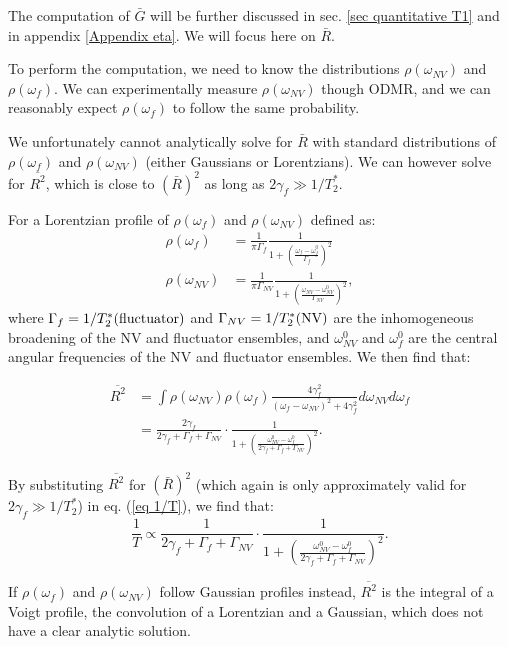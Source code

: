 \documentclass[a4paper, 11pt]{report}
\begin{document}
The computation of $\bar G$ will be further discussed in sec. \ref{sec quantitative T1} and in appendix \ref{Appendix eta}. We will focus here on $\bar R$.

To perform the computation, we need to know the distributions $\rho(\omega_{NV})$ and $\rho(\omega_{f})$. We can experimentally measure $\rho(\omega_{NV})$ though ODMR, and we can reasonably expect $\rho(\omega_{f})$ to follow the same probability.

We unfortunately cannot analytically solve for $\bar R$ with standard distributions of $\rho(\omega_{f})$ and $\rho(\omega_{NV})$ (either Gaussians or Lorentzians). We can however solve for $\overline{R^2}$, which is close to $(\bar{R})^2$ as long as $2 \gamma_f \gg 1/T_2^*$.

For a Lorentzian profile of $\rho(\omega_{f})$ and $\rho(\omega_{NV})$ defined as:
\begin{align*}
\rho(\omega_{f})&=\frac{1}{\pi \Gamma_f} \frac{1}{1+ \left(\frac{\omega_f-\omega^0_f}{\Gamma_f}\right)^2} \\
\rho(\omega_{NV})&=\frac{1}{\pi \Gamma_{NV}} \frac{1}{1+ \left(\frac{\omega_{NV}-\omega^0_{NV}}{\Gamma_{NV}}\right)^2},
\end{align*}
where $\Gamma_{f}=1/T_2^*(\rm fluctuator)$ and $\Gamma_{NV}=1/T_2^*(\rm NV)$ are the inhomogeneous broadening of the NV and fluctuator ensembles, and $\omega^0_{NV}$ and $\omega^0_{f}$ are the central angular frequencies of the NV and fluctuator ensembles. We then find that:

\begin{align*}
\overline{R^2}&= \int \rho(\omega_{NV}) \rho(\omega_{f}) \frac{4\gamma_f^2}{(\omega_f - \omega_{NV})^2+4\gamma_f^2} d\omega_{NV} d\omega_{f} \\
&=\frac{2 \gamma_f}{2 \gamma_f + \Gamma_f + \Gamma_{NV}} \cdot \frac{1}{1+\left(\frac{\omega^0_{NV}-\omega^0_{f}}{2 \gamma_f + \Gamma_f + \Gamma_{NV}}\right)^2}.
\end{align*}

By substituting $\overline{R ^2}$ for $(\bar{R})^2$ (which again is only approximately valid for $2 \gamma_f \gg 1/T_2^*$) in eq. (\ref{eq 1/T}), we find that:
\begin{equation}
\label{eq 1/T avec T2*}
\frac{1}{T} \propto \frac{1}{2\gamma_f + \Gamma_f + \Gamma_{NV}}\cdot \frac{1}{1+\left(\frac{\omega^0_{NV}-\omega^0_{f}}{2 \gamma_f + \Gamma_f + \Gamma_{NV}}\right)^2}.
\end{equation}

If $\rho(\omega_{f})$ and $\rho(\omega_{NV})$ follow Gaussian profiles instead, $\overline{R^2}$ is the integral of a Voigt profile, the convolution of a Lorentzian and a Gaussian, which does not have a clear analytic solution.
\end{document}
